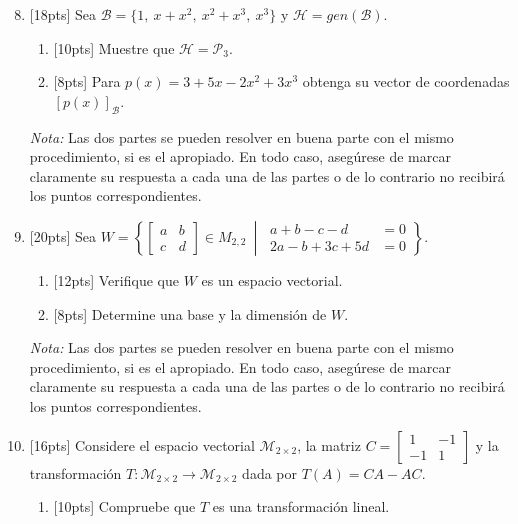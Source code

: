 \documentclass[11pt]{article}
\begin{document}
\begin{enumerate}
\setcounter{enumi}{7}
\item{}[18pts] Sea $\mathcal{B}=\{1,\ x+x^2,\ x^2+x^3,\ x^3\}$ y $\mathcal{H}=gen(\mathcal{B})$.
\begin{enumerate}
\item{}[10pts] Muestre que $\mathcal{H}=\mathcal{P}_3$.

\vspace{6cm}

\item{}[8pts] Para $p(x)=3+5x-2x^2+3x^3$ obtenga su vector de coordenadas $[p(x)]_{\mathcal{B}}$.

\vspace{5cm}
\end{enumerate}
\noindent \textit{Nota:} Las dos partes se pueden resolver en buena parte con el mismo procedimiento, si es el apropiado. En todo caso, asegúrese de marcar claramente su respuesta a cada una de las partes o de lo contrario no recibirá los puntos correspondientes.

\item{}[20pts] Sea $W=\left\{\begin{bmatrix}a&b\\c&d\end{bmatrix}\in M_{2,2}\ \middle|\ \begin{aligned}a+b-c-d&=0\\2a-b+3c+5d&=0\end{aligned}\right\}$.
\begin{enumerate}
\item{}[12pts] Verifique que $W$ es un espacio vectorial.

\vspace{5cm}

\item{}[8pts] Determine una base y la dimensión de $W$.

\vspace{5cm}
\end{enumerate}
\noindent \textit{Nota:} Las dos partes se pueden resolver en buena parte con el mismo procedimiento, si es el apropiado. En todo caso, asegúrese de marcar claramente su respuesta a cada una de las partes o de lo contrario no recibirá los puntos correspondientes.

\newpage
\item{}[16pts] Considere el espacio vectorial $\mathcal{M}_{2\times 2}$, la matriz $C=\begin{bmatrix}1&-1\\-1&1\end{bmatrix}$ y la transformación $T:\mathcal{M}_{2\times 2}\longrightarrow\mathcal{M}_{2\times 2}$ dada por $T(A)=CA-AC$.
\begin{enumerate}
\item{}[10pts] Compruebe que $T$ es una transformación lineal.


\end{enumerate}
\end{enumerate}
\end{document}
